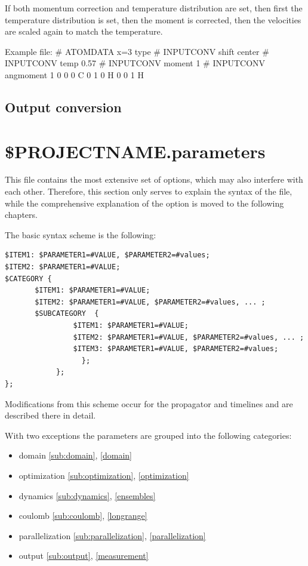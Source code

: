If both momentum correction and temperature distribution are set, then first the
temperature distribution is set, then the moment is corrected, then the velocities
are scaled again to match the temperature.

 Example file:
\# ATOMDATA x=3 type
\# INPUTCONV shift center
\# INPUTCONV temp 0.57
\# INPUTCONV moment 1
\# INPUTCONV angmoment 1
0 0 0 C
0 1 0 H
0 0 1 H
\subsection{Output conversion}
\label{OUTPUTCONV}


\section{\$PROJECTNAME.parameters}
\label{.parameters}

This file contains the most extensive set of options, which may also interfere with each other. Therefore, this section only serves to explain the syntax of the file, while the comprehensive explanation of the option is moved to the following chapters.

The basic syntax scheme is the following:
\begin{lstlisting}
$ITEM1: $PARAMETER1=#VALUE, $PARAMETER2=#values;
$ITEM2: $PARAMETER1=#VALUE;
$CATEGORY {
       $ITEM1: $PARAMETER1=#VALUE;
       $ITEM2: $PARAMETER1=#VALUE, $PARAMETER2=#values, ... ;
       $SUBCATEGORY  {
                $ITEM1: $PARAMETER1=#VALUE;
                $ITEM2: $PARAMETER1=#VALUE, $PARAMETER2=#values, ... ;
                $ITEM3: $PARAMETER1=#VALUE, $PARAMETER2=#values;
                  };
            };
};
\end{lstlisting}
Modifications from this scheme occur for the propagator and timelines and are described there in detail.



With two exceptions the parameters are grouped into the following categories:
\begin{itemize}
 \item domain \ref{sub:domain}, \ref{domain}
 \item optimization \ref{sub:optimization}, \ref{optimization}
 \item dynamics \ref{sub:dynamics}, \ref{ensembles}
 \item coulomb \ref{sub:coulomb}, \ref{longrange}
 \item parallelization \ref{sub:parallelization}, \ref{parallelization}
 \item output \ref{sub:output}, \ref{measurement}
\end{itemize}

